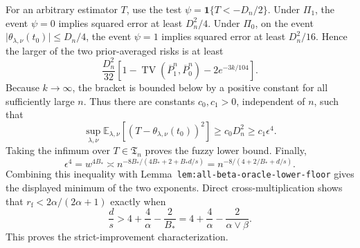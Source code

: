 For an arbitrary estimator \(T\), use the test \(\psi=\mathbf 1\{T<-D_n/2\}\). Under \(\Pi_1\), the event \(\psi=0\) implies squared error at least \(D_n^2/4\). Under \(\Pi_0\), on the event \(\lvert\theta_{\lambda,\nu}(t_0)\rvert\le D_n/4\), the event \(\psi=1\) implies squared error at least \(D_n^2/16\). Hence the larger of the two prior-averaged risks is at least
\[
\frac{D_n^2}{32}
\left[1-\operatorname{TV}(\overline P_1^n,\overline P_0^n)-2e^{-3k/104}\right].
\]
Because \(k\to\infty\), the bracket is bounded below by a positive constant for all sufficiently large \(n\). Thus there are constants \(c_0,c_1>0\), independent of \(n\), such that
\[
\sup_{\lambda,\nu}
\mathbb E_{\lambda,\nu}[(T-\theta_{\lambda,\nu}(t_0))^2]
\ge c_0D_n^2
\ge c_1\epsilon^4.
\]
Taking the infimum over \(T\in\mathfrak T_n\) proves the fuzzy lower bound. Finally,
\[
\epsilon^4=w^{4B_*}
\asymp
n^{-8B_*/(4B_*+2+B_*d/s)}
=
n^{-8/(4+2/B_*+d/s)}.
\]
Combining this inequality with Lemma~\texttt{lem:all-beta-oracle-lower-floor} gives the displayed minimum of the two exponents. Direct cross-multiplication shows that \(r_{\mathrm f}<2\alpha/(2\alpha+1)\) exactly when
\[
\frac ds>4+\frac4\alpha-\frac{2}{B_*}
=4+\frac4\alpha-\frac{2}{\alpha\vee\beta}.
\]
This proves the strict-improvement characterization.